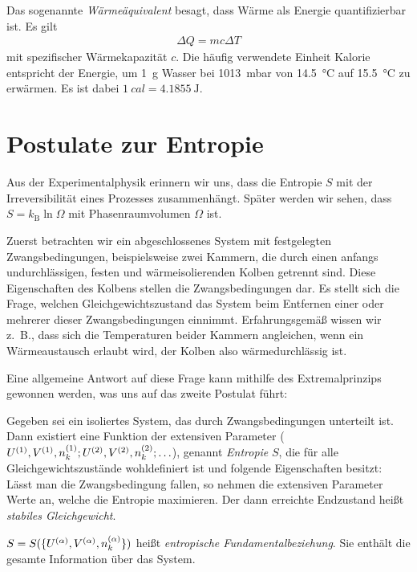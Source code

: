 Das sogenannte \emph{Wärmeäquivalent} besagt, dass Wärme als Energie quantifizierbar ist. Es gilt
\begin{align*}
    \Delta Q = mc\Delta T
\end{align*}
mit spezifischer Wärmekapazität $c$.
Die häufig verwendete Einheit Kalorie entspricht der Energie, um \SI{1}{\g} Wasser bei \SI{1013}{\milli\bar} von \SI{14,5}{\degreeCelsius} auf \SI{15,5}{\degreeCelsius} zu erwärmen. Es ist dabei $\SI{1}{cal} = \SI{4,1855}{\joule}$.



\section{Postulate zur Entropie}

Aus der Experimentalphysik erinnern wir uns, dass die Entropie $S$ mit der Irreversibilität eines Prozesses zusammenhängt. Später werden wir sehen, dass $S=k_\mathrm{B}\ln{\Omega}$ mit Phasenraumvolumen $\Omega$ ist.

Zuerst betrachten wir ein abgeschlossenes System mit festgelegten Zwangsbedingungen, beispielsweise zwei Kammern, die durch einen anfangs undurchlässigen, festen und wärmeisolierenden Kolben getrennt sind. Diese Eigenschaften des Kolbens stellen die Zwangsbedingungen dar. Es stellt sich die Frage, welchen Gleichgewichtszustand das System beim Entfernen einer oder mehrerer dieser Zwangsbedingungen einnimmt. Erfahrungsgemäß wissen wir z.~B., dass sich die Temperaturen beider Kammern angleichen, wenn ein Wärmeaustausch erlaubt wird, der Kolben also wärmedurchlässig ist.

Eine allgemeine Antwort auf diese Frage kann mithilfe des Extremalprinzips gewonnen werden, was uns auf das zweite Postulat führt:

\begin{postulate}
    \label{post:entropie_maximierung}
    Gegeben sei ein isoliertes System, das durch Zwangsbedingungen unterteilt ist. Dann existiert eine Funktion der extensiven Parameter ($U^{(1)},V^{(1)},n_k^{(1)};U^{(2)},V^{(2)},n_k^{(2)}; \ldots$), genannt \emph{Entropie} $S$, die für alle Gleichgewichtszustände wohldefiniert ist und folgende Eigenschaften besitzt: Lässt man die Zwangsbedingung fallen, so nehmen die extensiven Parameter Werte an, welche die Entropie maximieren. Der dann erreichte Endzustand heißt \emph{stabiles Gleichgewicht}.

    $S=S(\{U^{(\alpha)},V^{(\alpha)},n_k^{(\alpha)}\})$ heißt \emph{entropische Fundamentalbeziehung}. Sie enthält die gesamte Information über das System.
\end{postulate}


